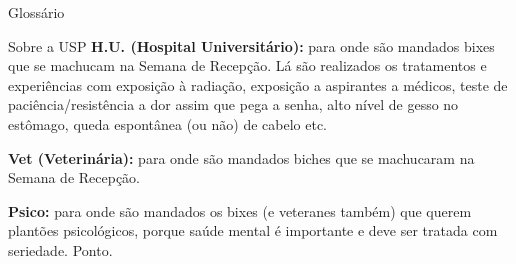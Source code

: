 \begin{secao}{Glossário}
\begin{subsecao}{Sobre a USP}
{\bf H.U. (Hospital Universitário):} para onde são mandados bixes que se
machucam na Semana de Recepção. Lá são realizados os tratamentos e experiências
com exposição à radiação, exposição a aspirantes a médicos, teste de
paciência/resistência a dor assim que pega a senha, alto nível de gesso no
estômago, queda espontânea (ou não) de cabelo etc.

{\bf Vet (Veterinária):} para onde são mandados biches que se machucaram na
Semana de Recepção.

{\bf Psico:} para onde são mandados os bixes (e veteranes também) que querem
plantões psicológicos, porque saúde mental é importante e deve ser tratada com
seriedade. Ponto.

\end{subsecao}
\end{secao}
